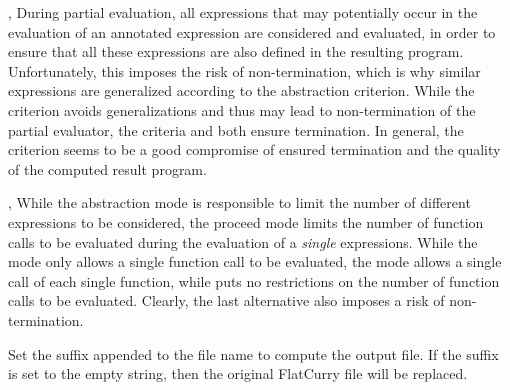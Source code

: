 \begin{description}
\item{, }
During partial evaluation, all expressions that may potentially
occur in the evaluation of an annotated expression are considered and
evaluated, in order to ensure that all these expressions are also
defined in the resulting program.
Unfortunately, this imposes the risk of non-termination,
which is why similar expressions are generalized according to the
abstraction criterion.
While the  criterion avoids generalizations
and thus may lead to non-termination of the partial evaluator,
the criteria  and  both ensure termination.
In general, the criterion  seems to be a good compromise
of ensured termination and the quality of the computed result program.

\item{, }
While the abstraction mode is responsible to limit the number of
different expressions to be considered, the proceed mode
limits the number of function calls to be evaluated during
the evaluation of a \emph{single} expressions.
While the mode  only allows a single function call
to be evaluated, the mode  allows a single call
of each single function, while  puts no restrictions
on the number of function calls to be evaluated.
Clearly, the last alternative also imposes a risk of non-termination.

\item{}
Set the suffix appended to the file name to compute the output file.
If the suffix is set to the empty string, then the original FlatCurry
file will be replaced.
\end{description}
